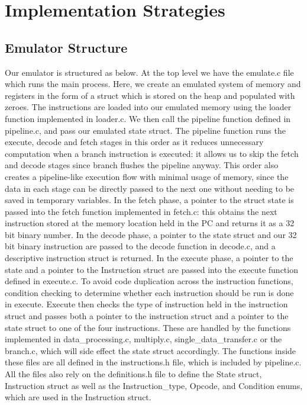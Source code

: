 \documentclass[10pt]{article}
\begin{document}
  \section*{Implementation Strategies}

  \subsection*{Emulator Structure}

Our emulator is structured as below. At the top level we have the emulate.c file which runs the main process. Here, we create an emulated system of memory and registers in the form of a struct which is stored on the heap and populated with zeroes. The instructions are loaded into our emulated memory using the loader function implemented in loader.c. We then call the pipeline function defined in pipeline.c, and pass our emulated state struct. The pipeline function runs the execute, decode and
  fetch stages in this order as it reduces unnecessary computation when a branch instruction is executed: it allows us to skip the fetch and decode stages since branch flushes the pipeline anyway. This order also creates a pipeline-like execution flow with minimal usage of memory, since the data in each stage can be directly passed to the next one without needing to be saved in temporary variables. In the fetch phase, a pointer to the struct state is passed into the fetch function implemented in
  fetch.c: this obtains the next instruction stored at the memory location held in the PC and returns it as a 32 bit binary number. In the decode phase, a pointer to the state struct and our 32 bit binary instruction are passed to the decode function in decode.c, and a descriptive instruction struct is returned. In the execute phase, a pointer to the state and a pointer to the Instruction struct are passed into the execute function defined in execute.c. To avoid code duplication across the
  instruction functions, condition checking to determine whether each instruction should be run is done in execute. Execute then checks the type of instruction held in the instruction struct and passes both a pointer to the instruction struct and a pointer to the state struct to one of the four instructions. These are handled by the functions implemented in data\_processing.c, multiply.c, single\_data\_transfer.c or the branch.c, which will side effect the state struct accordingly. The functions inside these files are all defined in the instructions.h file, which is included by pipeline.c. All the files also rely on the definitions.h file to define the State struct, Instruction struct as well as the Instruction\_type, Opcode, and Condition enums, which are used in the Instruction struct. 
\end{document}
